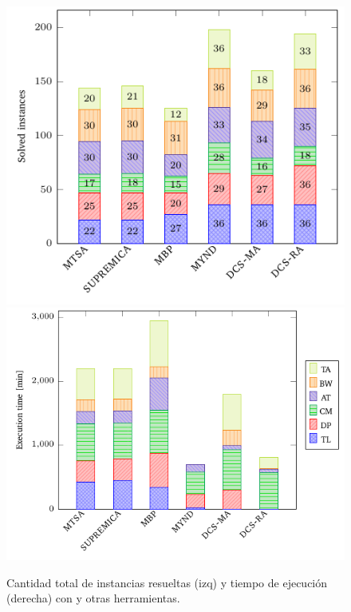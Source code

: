 \begin{figure}[th]
	\centering
	\vspace{10cm}
	\hspace{-2cm}
	\begin{minipage}[T]{1.20\linewidth}
		\vspace{-95mm}
		\includegraphics[scale=.905]{figures/nuestrosResults/instances.pdf}\label{fig:dcs:results:instances}
		\includegraphics[scale=.905]{figures/nuestrosResults/time.pdf}\label{fig:dcs:results:time}
	\end{minipage}
	\caption{Cantidad total de instancias resueltas (izq) y tiempo de ejecución (derecha) con \DCS y otras herramientas.}
	\label{fig:dcs:results}
\end{figure}










